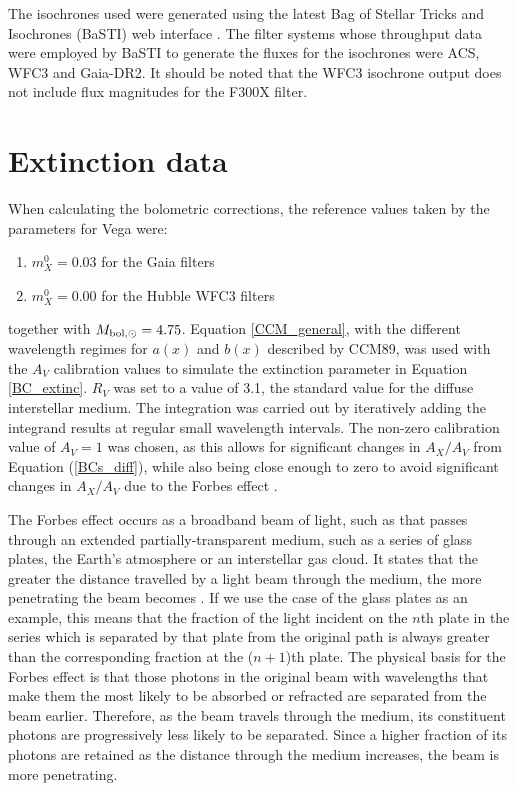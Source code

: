 \documentclass[12pt, a4paper]{report}
\begin{document}
The isochrones used were generated using the latest Bag of Stellar Tricks and Isochrones (BaSTI) web interface \citep{2018ApJ...856..125H}. The filter systems whose throughput data were employed by BaSTI to generate the fluxes for the isochrones were ACS, WFC3 and Gaia-DR2. It should be noted that the WFC3 isochrone output does not include flux magnitudes for the F300X filter.

\section{Extinction data}
When calculating the bolometric corrections, the reference values taken by the parameters for Vega were:

\begin{enumerate}
\item $m_{X}^{0} = 0.03$ for the Gaia filters
\item $m_{X}^{0} = 0.00$ for the Hubble WFC3 filters
\end{enumerate}

together with $M_{\textnormal{bol},\odot} = 4.75$. Equation \ref{CCM_general}, with the different wavelength regimes for $a(x)$ and $b(x)$ described by CCM89, was used with the $A_{V}$ calibration values to simulate the extinction parameter in Equation \ref{BC_extinc}. $R_{V}$ was set to a value of 3.1, the standard value for the diffuse interstellar medium. The integration was carried out by iteratively adding the integrand results at regular small wavelength intervals. The non-zero calibration value of $A_{V} = 1$ was chosen, as this allows for significant changes in $A_{X}/A_{V}$ from Equation (\ref{BCs_diff}), while also being close enough to zero to avoid significant changes in $A_{X}/A_{V}$ due to the Forbes effect \citep{2008PASP..120..583G}.

The Forbes effect occurs as a broadband beam of light, such as that passes through an extended partially-transparent medium, such as a series of glass plates, the Earth's atmosphere or an interstellar gas cloud. It states that the greater the distance travelled by a light beam through the medium, the more penetrating the beam becomes \citep{1842RSPT..132..225F}. If we use the case of the glass plates as an example, this means that the fraction of the light incident on the $n$th plate in the series which is separated by that plate from the original path is always greater than the corresponding fraction at the ($n+1$)th plate. The physical basis for the Forbes effect is that those photons in the original beam with wavelengths that make them the most likely to be absorbed or refracted are separated from the beam earlier. Therefore, as the beam travels through the medium, its constituent photons are progressively less likely to be separated. Since a higher fraction of its photons are retained as the distance through the medium increases, the beam is more penetrating.
\end{document}
